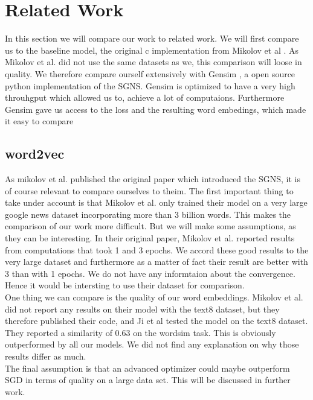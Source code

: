 \section{Related Work}
In this section we will compare our work to related work. We will first compare us to the baseline model, the original c implementation from Mikolov et al \cite{Mikolov}. As Mikolov et al. did not use the same datasets as we, this comparison will loose in quality. We therefore compare ourself extensively with Gensim \cite{gensim}, a open source python implementation of the SGNS. Gensim is optimized to have a very high throuhgput which allowed us to, achieve a lot of computaions. Furthermore Gensim gave us access to the loss and the resulting word embedings, which made it easy to compare 

\subsection{word2vec}

As mikolov et al. published the original paper which introduced the SGNS, it is of course relevant to compare ourselves to theim. The first important thing to take under account is that Mikolov et al. only trained their model on a very large google news dataset incorporating more than 3 billion words. This makes the comparison of our work more difficult. But we will make some assumptions, as they can be interesting. 
In their original paper, Mikolov et al. reported results from computations that took 1 and 3 epochs. We accord these good results to the very large dataset  and furthermore as a matter of fact their result are better with 3 than with 1 epochs. We do not have any informtaion about the convergence. Hence it would be intersting to use their dataset for comparison. \\
One thing we can compare is the quality of our word embeddings. Mikolov et al. did not report any results on their model with the text8 dataset, but they therefore published their code, and Ji et al \cite{intel} tested the model on the text8 dataset. They reported a similarity of 0.63 on the wordsim task. This is obviously outperformed by all our models. We did not find any explanation on why those results differ as much. \\
The final assumption is that an advanced optimizer could maybe outperform SGD in terms of quality on a large data set. This will be discussed in further work.
 


